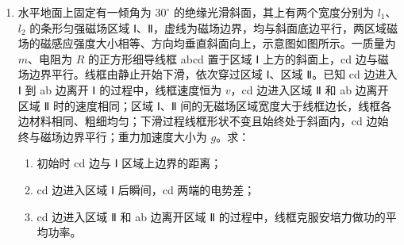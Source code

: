 \documentclass[\gkver]{gaokaozhenti}
\begin{document}
\begin{enumerate}


\item
水平地面上固定有一倾角为 $30^\circ$ 的绝缘光滑斜面，其上有两个宽度分别为 $l_{1}$、$l_{2}$ 的条形匀强磁场区域 Ⅰ、Ⅱ，虚线为磁场边界，均与斜面底边平行，两区域磁场的磁感应强度大小相等、方向均垂直斜面向上，示意图如图所示。一质量为 $m$、电阻为 $R$ 的正方形细导线框 abcd 置于区域 Ⅰ 上方的斜面上，cd 边与磁场边界平行。线框由静止开始下滑，依次穿过区域 Ⅰ、区域 Ⅱ。已知 cd 边进入 Ⅰ 到 ab 边离开 Ⅰ 的过程中，线框速度恒为 $v$，cd 边进入区域 Ⅱ 和 ab 边离开区域 Ⅱ 时的速度相同；区域 Ⅰ、Ⅱ 间的无磁场区域宽度大于线框边长，线框各边材料相同、粗细均匀；下滑过程线框形状不变且始终处于斜面内，cd 边始终与磁场边界平行；重力加速度大小为 $g$。求：
\begin{enumerate}
	\item
	初始时 cd 边与 Ⅰ 区域上边界的距离；
	\item
	cd 边进入区域 Ⅰ 后瞬间，cd 两端的电势差；
	\item
	cd 边进入区域 Ⅱ 和 ab 边离开区域 Ⅱ 的过程中，线框克服安培力做功的平均功率。
\end{enumerate}


\end{enumerate}
\end{document}
